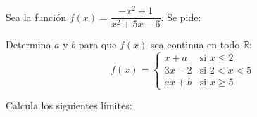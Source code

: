 \documentclass[addpoints,spanish, 12pt,a4paper]{exam}
\renewcommand*\half{.5}
\begin{document}
\begin{questions}

\question Sea la función \( f(x) = \dfrac{-x^2+1}{x^2+5x-6} \). Se pide:





\question[2] Determina \( a \) y \( b \) para que \( f(x) \) sea continua en todo \( \mathbb{R} \):
\[
f(x) =
\begin{cases}
    x + a & \text{si } x \leq 2 \\
    3x - 2 & \text{si } 2 < x < 5 \\
    ax + b & \text{si } x \geq 5
\end{cases}
\]


\question Calcula los siguientes límites:

\end{questions}
\end{document}
